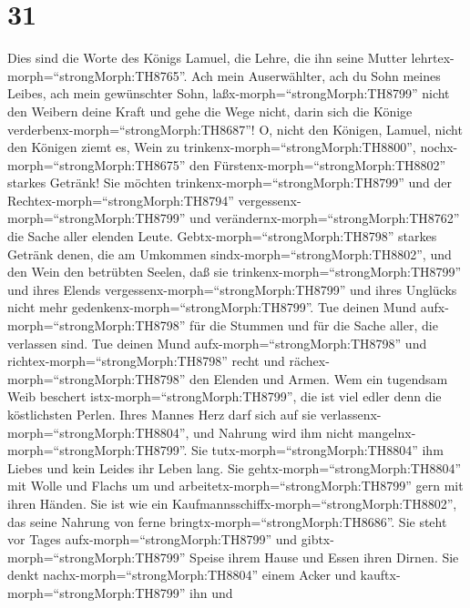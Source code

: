\hypertarget{section-30}{%
\section{31}\label{section-30}}

 Dies sind die Worte des Königs Lamuel, die Lehre, die ihn
seine Mutter lehrtex-morph=``strongMorph:TH8765''.  Ach mein
Auserwählter, ach du Sohn meines Leibes, ach mein gewünschter Sohn,
 laßx-morph=``strongMorph:TH8799'' nicht den Weibern deine
Kraft und gehe die Wege nicht, darin sich die Könige
verderbenx-morph=``strongMorph:TH8687''!  O, nicht den
Königen, Lamuel, nicht den Königen ziemt es, Wein zu
trinkenx-morph=``strongMorph:TH8800'',
nochx-morph=``strongMorph:TH8675'' den
Fürstenx-morph=``strongMorph:TH8802'' starkes Getränk!  Sie
möchten trinkenx-morph=``strongMorph:TH8799'' und der
Rechtex-morph=``strongMorph:TH8794''
vergessenx-morph=``strongMorph:TH8799'' und
verändernx-morph=``strongMorph:TH8762'' die Sache aller elenden Leute.
 Gebtx-morph=``strongMorph:TH8798'' starkes Getränk denen,
die am Umkommen sindx-morph=``strongMorph:TH8802'', und den Wein den
betrübten Seelen,  daß sie
trinkenx-morph=``strongMorph:TH8799'' und ihres Elends
vergessenx-morph=``strongMorph:TH8799'' und ihres Unglücks nicht mehr
gedenkenx-morph=``strongMorph:TH8799''.  Tue deinen Mund
aufx-morph=``strongMorph:TH8798'' für die Stummen und für die Sache
aller, die verlassen sind.  Tue deinen Mund
aufx-morph=``strongMorph:TH8798'' und
richtex-morph=``strongMorph:TH8798'' recht und
rächex-morph=``strongMorph:TH8798'' den Elenden und Armen. 
Wem ein tugendsam Weib beschert istx-morph=``strongMorph:TH8799'', die
ist viel edler denn die köstlichsten Perlen.  Ihres Mannes
Herz darf sich auf sie verlassenx-morph=``strongMorph:TH8804'', und
Nahrung wird ihm nicht mangelnx-morph=``strongMorph:TH8799''.
 Sie tutx-morph=``strongMorph:TH8804'' ihm Liebes und kein
Leides ihr Leben lang.  Sie
gehtx-morph=``strongMorph:TH8804'' mit Wolle und Flachs um und
arbeitetx-morph=``strongMorph:TH8799'' gern mit ihren Händen.
 Sie ist wie ein
Kaufmannsschiffx-morph=``strongMorph:TH8802'', das seine Nahrung von
ferne bringtx-morph=``strongMorph:TH8686''.  Sie steht vor
Tages aufx-morph=``strongMorph:TH8799'' und
gibtx-morph=``strongMorph:TH8799'' Speise ihrem Hause und Essen ihren
Dirnen.  Sie denkt nachx-morph=``strongMorph:TH8804'' einem
Acker und kauftx-morph=``strongMorph:TH8799'' ihn und
